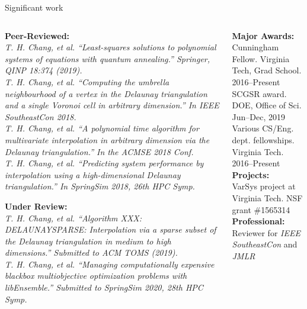 \documentclass[xcolor=dvipsnames]{beamer}
\begin{document}
\begin{frame}{Significant work}
\begin{columns}
\begin{column}{.48\textwidth}
\textbf{Peer-Reviewed:}\\
\smallskip
{\tiny
{\it T. H. Chang, et al. ``Least-squares solutions to polynomial systems of
equations with quantum annealing.'' Springer, QINP 18:374 (2019).}\\
\medskip
{\it T. H. Chang, et al. ``Computing the umbrella neighbourhood of a vertex in
the Delaunay triangulation and a single Voronoi cell in arbitrary dimension.''
In IEEE SoutheastCon 2018.}\\
\medskip
{\it T. H. Chang, et al. 
``A polynomial time algorithm for multivariate interpolation in arbitrary
dimension via the Delaunay triangulation.''
In the ACMSE 2018 Conf.}\\
\medskip
{\it T. H. Chang, et al.
``Predicting system performance by interpolation using a high-dimensional Delaunay triangulation.''
In SpringSim 2018, 26th HPC Symp.}\\
}

\textbf{Under Review:}\\
\smallskip
{\tiny
{\it T. H. Chang, et al.
``Algorithm XXX: DELAUNAYSPARSE: Interpolation via a sparse subset of the
Delaunay triangulation in medium to high dimensions.''
Submitted to ACM TOMS (2019).}\\
\medskip
{\it T. H. Chang, et al.
``Managing computationally expensive blackbox multiobjective optimization
problems with libEnsemble.''
Submitted to SpringSim 2020, 28th HPC Symp.}\\
}
\end{column}
\begin{column}{.48\textwidth}
\textbf{Major Awards:}\\
{\small Cunningham Fellow. Virginia Tech, Grad School. 2016--Present}\\
\medskip
{\small SCGSR award. DOE, Office of Sci. Jun--Dec, 2019}\\
\medskip
{\small Various CS/Eng. dept. fellowships. Virginia Tech. 2016--Present}\\
\medskip
\textbf{Projects:}\\
{\small VarSys project at Virginia Tech. NSF grant \#1565314}\\
\medskip
\textbf{Professional:}\\
{\small Reviewer for {\it IEEE SoutheastCon} and {\it JMLR}}
\end{column}
\end{columns}
\end{frame}
\end{document}
